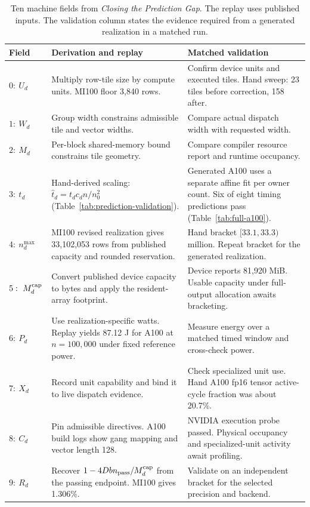 \documentclass[sigplan,10pt,review,balance=false,pbalance=false]{acmart}
\begin{document}
\begin{table}[tp]
\centering\footnotesize
\caption{Ten machine fields from \emph{Closing the Prediction Gap}. The replay uses published inputs. The validation column states the evidence required from a generated realization in a matched run.}\label{tab:ten-calibration}
\begin{tabular}{@{}p{}p{}p{}@{}}\toprule
Field & Derivation and replay & Matched validation \\\midrule
$0:\ U_d$ & Multiply row-tile size by compute units. MI100 floor 3,840 rows. & Confirm device units and executed tiles. Hand sweep: 23 tiles before correction, 158 after. \\
$1:\ W_d$ & Group width constrains admissible tile and vector widths. & Compare actual dispatch width with requested width. \\
$2:\ M_d$ & Per-block shared-memory bound constrains tile geometry. & Compare compiler resource report and runtime occupancy. \\
$3:\ t_d$ & Hand-derived scaling: $\widehat t_d=t_dc_dn/n_0^2$ (Table~\ref{tab:prediction-validation}). & Generated A100 uses a separate affine fit per owner count. Six of eight timing predictions pass (Table~\ref{tab:full-a100}). \\
$4:\ n_d^{\max}$ & MI100 revised realization gives 33,102,053 rows from published capacity and rounded reservation. & Hand bracket $[33.1,33.3)$ million. Repeat bracket for the generated realization. \\
$5:\ M_d^{\rm cap}$ & Convert published device capacity to bytes and apply the resident-array footprint. & Device reports 81,920 MiB. Usable capacity under full-output allocation awaits bracketing. \\
$6:\ P_d$ & Use realization-specific watts. Replay yields 87.12 J for A100 at $n=100{,}000$ under fixed reference power. & Measure energy over a matched timed window and cross-check power. \\
$7:\ X_d$ & Record unit capability and bind it to live dispatch evidence. & Check specialized unit use. Hand A100 fp16 tensor active-cycle fraction was about 20.7\%. \\
$8:\ C_d$ & Pin admissible directives. A100 build logs show gang mapping and vector length 128. & NVIDIA execution probe passed. Physical occupancy and specialized-unit activity await profiling. \\
$9:\ R_d$ & Recover $1-4Dbn_{\rm pass}/M_d^{\rm cap}$ from the passing endpoint. MI100 gives 1.306\%. & Validate on an independent bracket for the selected precision and backend. \\
\bottomrule\end{tabular}
\end{table}
\end{document}
